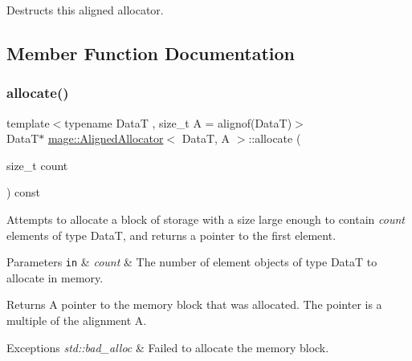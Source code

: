 Destructs this aligned allocator. 

\subsection{Member Function Documentation}
\mbox{\label{classmage_1_1_aligned_allocator_a36b9cadd671e1de11e9b6534887881be}} 
\subsubsection{\texorpdfstring{allocate()}{allocate()}\hspace{0.1cm}{\footnotesize\ttfamily [1/2]}}
{\footnotesize\ttfamily template$<$typename DataT , size\+\_\+t A = alignof(\+Data\+T)$>$ \\
DataT$\ast$ \mbox{\hyperlink{classmage_1_1_aligned_allocator}{mage\+::\+Aligned\+Allocator}}$<$ DataT, A $>$\+::allocate (\begin{DoxyParamCaption}\item[{size\+\_\+t}]{count }\end{DoxyParamCaption}) const}

Attempts to allocate a block of storage with a size large enough to contain {\itshape count} elements of type {\ttfamily DataT}, and returns a pointer to the first element.


\begin{DoxyParams}[1]{Parameters}
\mbox{\tt in}  & {\em count} & The number of element objects of type {\ttfamily DataT} to allocate in memory. \\
\hline
\end{DoxyParams}
\begin{DoxyReturn}{Returns}
A pointer to the memory block that was allocated. The pointer is a multiple of the alignment {\ttfamily A}. 
\end{DoxyReturn}

\begin{DoxyExceptions}{Exceptions}
{\em std\+::bad\+\_\+alloc} & Failed to allocate the memory block. \\
\hline
\end{DoxyExceptions}
\mbox{\label{classmage_1_1_aligned_allocator_aeef56b84f3e0fd02181550b93f10c8e7}} 
